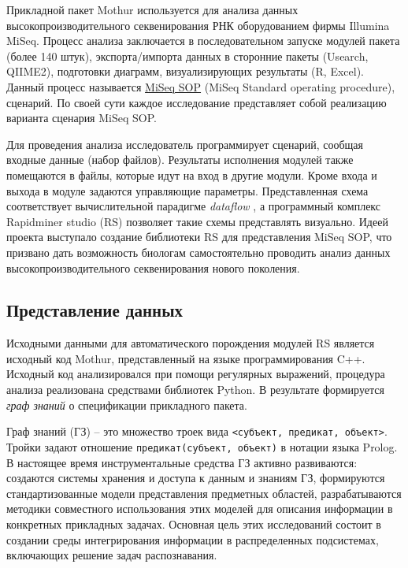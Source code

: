 \documentclass[12pt]{article}
\begin{document}
Прикладной пакет Mothur используется для анализа данных высокопроизводительного секвенирования РНК оборудованием фирмы Illumina MiSeq.  Процесс анализа заключается в последовательном запуске модулей пакета (более 140 штук), экспорта/импорта данных в сторонние пакеты (Usearch, QIIME2), подготовки диаграмм, визуализирующих результаты (R, Excel).  Данный процесс называется \href{https://mothur.org/wiki/miseq_sop/}{MiSeq SOP} (MiSeq Standard operating procedure), сценарий.  По своей сути каждое исследование представляет собой реализацию варианта сценария MiSeq SOP.

Для проведения анализа исследователь программирует сценарий, сообщая входные данные (набор файлов).  Результаты исполнения модулей также помещаются в файлы, которые идут на вход в другие модули.  Кроме входа и выхода в модуле задаются управляющие параметры.  Представленная схема соответствует вычислительной парадигме \emph{dataflow} \cite{dataflow}, а программный комплекс Rapidminer studio (RS) позволяет такие схемы представлять визуально.  Идеей проекта \cite{zont19} выступало создание библиотеки RS для представления MiSeq SOP, что призвано дать возможность биологам самостоятельно проводить анализ данных высокопроизводительного секвенирования нового поколения.

\subsection{Представление данных}

Исходными данными для автоматического порождения модулей RS является исходный код Mothur, представленный на языке программирования C++.  Исходный код анализировался при помощи регулярных выражений, процедура анализа реализована средствами библиотек Python.  В результате формируется \emph{граф знаний} \cite{kg} о спецификации прикладного пакета.

Граф знаний (ГЗ) -- это множество троек вида \texttt{<субъект, предикат, объект>}.  Тройки задают отношение \texttt{предикат(субъект, объект)} в нотации языка Prolog.  В настоящее время инструментальные средства ГЗ активно развиваются: создаются системы хранения и доступа к данным и знаниям ГЗ, формируются стандартизованные модели представления предметных областей, разрабатываются методики совместного использования этих моделей для описания информации в конкретных прикладных задачах.  Основная цель этих исследований состоит в создании среды интегрирования информации в распределенных подсистемах, включающих решение задач распознавания.
\end{document}
